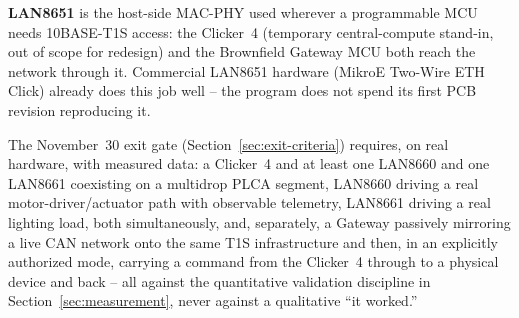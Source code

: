 \textbf{LAN8651} is the host-side MAC-PHY used wherever a programmable MCU needs 10BASE-T1S access: the Clicker~4 (temporary central-compute stand-in, out of scope for redesign) and the Brownfield Gateway MCU both reach the network through it. Commercial LAN8651 hardware (MikroE Two-Wire ETH Click) already does this job well -- the program does not spend its first PCB revision reproducing it.

The November~30 exit gate (Section~\ref{sec:exit-criteria}) requires, on real hardware, with measured data: a Clicker~4 and at least one LAN8660 and one LAN8661 coexisting on a multidrop PLCA segment, LAN8660 driving a real motor-driver/actuator path with observable telemetry, LAN8661 driving a real lighting load, both simultaneously, and, separately, a Gateway passively mirroring a live CAN network onto the same T1S infrastructure and then, in an explicitly authorized mode, carrying a command from the Clicker~4 through to a physical device and back -- all against the quantitative validation discipline in Section~\ref{sec:measurement}, never against a qualitative ``it worked.''
